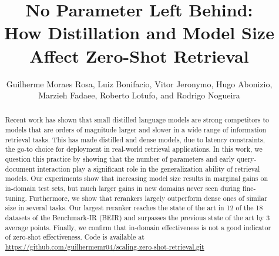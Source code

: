 \documentclass[sigconf,nonacm]{acmart}
\begin{document}
\title{No Parameter Left Behind:\\
How Distillation and Model Size Affect Zero-Shot Retrieval
}



\author{Guilherme Moraes Rosa, Luiz Bonifacio, Vitor Jeronymo, Hugo Abonizio, Marzieh Fadaee, Roberto Lotufo, and Rodrigo Nogueira}



















\renewcommand{\shortauthors}{Rosa, et al.}

\begin{abstract}

  Recent work has shown that small distilled language models are strong competitors to models that are orders of magnitude larger and slower in a wide range of information retrieval tasks. This has made distilled and dense models, due to latency constraints, the go-to choice for deployment in real-world retrieval applications. In this work, we question this practice by showing that the number of parameters and early query-document interaction play a significant role in the generalization ability of retrieval models. Our experiments show that increasing model size results in marginal gains on in-domain test sets, but much larger gains in new domains never seen during fine-tuning. Furthermore, we show that rerankers largely outperform dense ones of similar size in several tasks. Our largest reranker reaches the state of the art in 12 of the 18 datasets of the Benchmark-IR (BEIR) and surpasses the previous state of the art by 3 average points. Finally, we confirm that in-domain effectiveness is not a good indicator of zero-shot effectiveness. Code is available at \url{https://github.com/guilhermemr04/scaling-zero-shot-retrieval.git}
  

  
\end{abstract}





\end{document}

